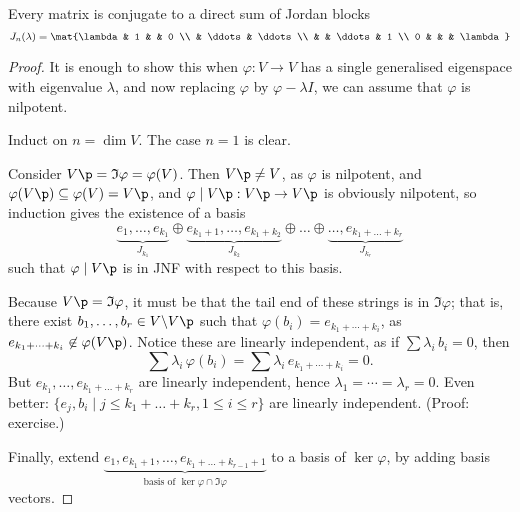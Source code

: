 	\pagebreak

\begin{theorem}
	 Every matrix is conjugate to a direct sum of Jordan blocks 
	\begin{equation*}
		J_n(\lambda) = \mat{\lambda & 1 & & 0 \\
		& \ddots & \ddots \\
		& & \ddots & 1 \\
		0 & & & \lambda}
	\end{equation*}
\end{theorem}

\begin{proof}
	It is enough to show this when $\varphi:V\to V$ has a single generalised eigenspace with eigenvalue $\lambda$, and now replacing $\varphi$ by $\varphi-\lambda I$, we can assume that $\varphi$ is nilpotent.
	
	Induct on $n=\dim V$. The case $n=1$ is clear.
	
	\newcommand{\ooplus}{\underset{\underset{\underset{\bigoplus}}{}}{,}}
	
	Consider $V\p=\Im\varphi=\varphi(V)$. Then $V\p\neq V$, as $\varphi$ is nilpotent, and $\varphi(V\p)\subseteq \varphi(V) = V\p$, and $\varphi\mid V\p:V\p\to V\p$ is obviously nilpotent, so induction gives the existence of a basis
	\begin{equation*}
		\underbrace{e_1,\ldots,e_{k_1}}_{J_{k_1}}
		\oplus
		\underbrace{e_{k_1+1},\ldots,e_{k_1+k_2}}_{J_{k_2}}
		\oplus
		\ldots
		\oplus
		\underbrace{\ldots,e_{k_1+\ldots+k_r}}_{J_{k_r}}
	\end{equation*}
	such that $\varphi\mid V\p$ is in JNF with respect to this basis.
	
	Because $V\p=\Im\varphi$, it must be that the tail end of these strings is in $\Im\varphi$; that is, there exist $b_1,\ldots,b_r\in V\backslash V\p$ such that $\varphi(b_i) = e_{k_1 + \cdots+ k_i}$, as $e_{k_1 + \cdots + k_i}\not\in\varphi(V\p)$. Notice these are linearly independent, as if $\sum \lambda_i \, b_i=0$, then
	\begin{equation*}
		\sum \lambda_i \, \varphi(b_i) = \sum \lambda_i \, e_{k_1+\cdots+k_i} = 0.
	\end{equation*}
	But $e_{k_1},\ldots,e_{k_1+\ldots+k_r}$ are linearly independent, hence $\lambda_1=\cdots=\lambda_r=0$. Even better: $\{e_j,b_i \mid j\leq k_1+\ldots+k_r, 1\leq i\leq r\}$ are linearly independent. (Proof: exercise.)
	
	Finally, extend $\underbrace{e_1,e_{k_1+1},\ldots,e_{k_1+\ldots+k_{r-1}+1}}_\text{basis of $\ker\varphi\cap\Im\varphi$}$ to a basis of $\ker\varphi$, by adding basis vectors.
	

\end{proof}
